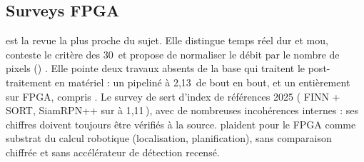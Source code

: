 \subsection{Surveys FPGA}

\citet{2025-hozhabr-survey-real-time-object-detection} est la revue la plus proche du
sujet. Elle distingue temps réel dur et mou, conteste le critère des 30\, et propose
de normaliser le débit par le nombre de pixels (\emph{}) .
Elle pointe deux travaux absents de la base qui traitent le post-traitement en matériel :
un  pipeliné à 2,13\, de bout en bout, et un  entièrement sur FPGA, 
compris . Le survey de
\citet{arxiv-2509.04153-real-time-fpga-cnns-detection}\pp{} sert d'index de références
2025 ( FINN + SORT, SiamRPN++ sur  à 1,11\,), avec de nombreuses incohérences
internes : ses chiffres doivent toujours être vérifiés à la source.
\citet{arxiv-2205.07149-robotic-computing-fpgas-current-progress}\pp{} plaident pour le
FPGA comme substrat du calcul robotique (localisation, planification), sans comparaison
chiffrée et sans accélérateur de détection recensé.
